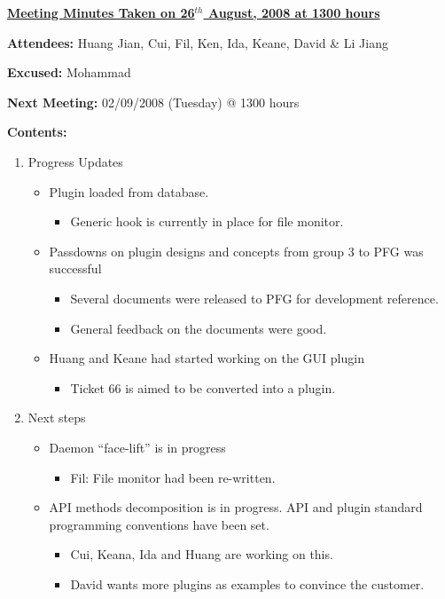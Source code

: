 \documentclass{letter}
\begin{document}
{\large \textbf{\underline{Meeting Minutes Taken on 26$^{th}$ August, 2008 at 1300 hours}}}

\textbf{Attendees:} Huang Jian, Cui, Fil, Ken, Ida, Keane, David \& Li Jiang 

\textbf{Excused:} Mohammad

\textbf{Next Meeting:} 02/09/2008 (Tuesday) @ 1300 hours 

\textbf{Contents:}

\begin{enumerate}
\item Progress Updates
	\begin{itemize}
		\item Plugin loaded from database.
			\begin{itemize}
				\item Generic hook is currently in place for file monitor.
			\end{itemize}
		\item Passdowns on plugin designs and concepts from group 3 to PFG was successful
			\begin{itemize}
					\item Several documents were released to PFG for development reference.
					\item General feedback on the documents were good.
			\end{itemize}
		\item Huang and Keane had started working on the GUI plugin
			\begin{itemize}
				\item Ticket 66 is aimed to be converted into a plugin. 
			\end{itemize}
	\end{itemize}
\item Next steps
	\begin{itemize}
		\item Daemon ``face-lift'' is in progress
			\begin{itemize}
				\item Fil: File monitor had been re-written.
			\end{itemize}
		\item API methods decomposition is in progress. API and plugin standard programming conventions have been set. 
			\begin{itemize}
				\item Cui, Keana, Ida and Huang are working on this. 
				\item David wants more plugins as examples to convince the customer.

\end{itemize}
\end{itemize}
\end{enumerate}
\end{document}
